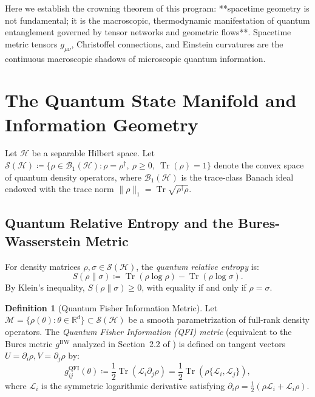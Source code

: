 \documentclass[11pt,a4paper,reqno]{amsart}
\theoremstyle{definition}
\newtheorem{definition}[theorem]{Definition}
\numberwithin{equation}{section}
\newcommand{\R}{\mathbb{R}}
\newcommand{\Tr}{\operatorname{Tr}}
\begin{document}
Here we establish the crowning theorem of this program: **spacetime geometry is not fundamental; it is the macroscopic, thermodynamic manifestation of quantum entanglement governed by tensor networks and geometric flows**. Spacetime metric tensors $g_{\mu\nu}$, Christoffel connections, and Einstein curvatures are the continuous macroscopic shadows of microscopic quantum information.

\section{The Quantum State Manifold and Information Geometry}
\label{sec:quantum_info_geom}

Let $\mathscr{H}$ be a separable Hilbert space. Let $\mathcal{S}(\mathscr{H}) \coloneqq \{\rho \in \mathcal{B}_1(\mathscr{H}) \colon \rho = \rho^\dagger, \ \rho \ge 0, \ \Tr(\rho) = 1\}$ denote the convex space of quantum density operators, where $\mathcal{B}_1(\mathscr{H})$ is the trace-class Banach ideal endowed with the trace norm $\|\rho\|_1 = \Tr\sqrt{\rho^\dagger \rho}$.

\subsection{Quantum Relative Entropy and the Bures-Wasserstein Metric}
For density matrices $\rho, \sigma \in \mathcal{S}(\mathscr{H})$, the \emph{quantum relative entropy} is:
\begin{equation}
    \label{eq:relative_entropy}
    S(\rho \| \sigma) \coloneqq \Tr(\rho \log \rho) - \Tr(\rho \log \sigma).
\end{equation}
By Klein's inequality, $S(\rho \| \sigma) \ge 0$, with equality if and only if $\rho = \sigma$.

\begin{definition}[Quantum Fisher Information Metric]
Let $\mathcal{M} = \{\rho(\theta) \colon \theta \in \R^d\} \subset \mathcal{S}(\mathscr{H})$ be a smooth parametrization of full-rank density operators. The \emph{Quantum Fisher Information (QFI) metric} (equivalent to the Bures metric $g^{\mathrm{BW}}$ analyzed in Section~2.2 of \cite{turing2026flows}) is defined on tangent vectors $U = \partial_i \rho, V = \partial_j \rho$ by:
\begin{equation}
    \label{eq:qfi_metric}
    g_{ij}^{\mathrm{QFI}}(\theta) \coloneqq \frac{1}{2} \Tr\left( \mathcal{L}_i \partial_j \rho \right) = \frac{1}{2} \Tr\left( \rho \{ \mathcal{L}_i, \mathcal{L}_j \} \right),
\end{equation}
where $\mathcal{L}_i$ is the symmetric logarithmic derivative satisfying $\partial_i \rho = \frac{1}{2}(\rho \mathcal{L}_i + \mathcal{L}_i \rho)$.
\end{definition}
\end{document}
